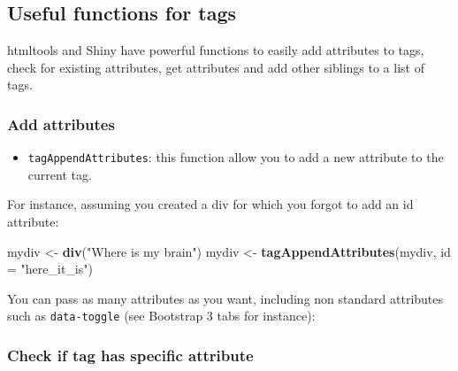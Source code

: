 \documentclass[
]{book}
\newenvironment{Shaded}{\begin{snugshade}}{\end{snugshade}}
\newcommand{\CommentTok}[1]{\textcolor[rgb]{0.56,0.35,0.01}{\textit{#1}}}
\newcommand{\DataTypeTok}[1]{\textcolor[rgb]{0.13,0.29,0.53}{#1}}
\newcommand{\KeywordTok}[1]{\textcolor[rgb]{0.13,0.29,0.53}{\textbf{#1}}}
\newcommand{\NormalTok}[1]{#1}
\newcommand{\OperatorTok}[1]{\textcolor[rgb]{0.81,0.36,0.00}{\textbf{#1}}}
\newcommand{\StringTok}[1]{\textcolor[rgb]{0.31,0.60,0.02}{#1}}
\providecommand{\tightlist}{%
  \setlength{\itemsep}{0pt}\setlength{\parskip}{0pt}}
\begin{document}
\hypertarget{useful-functions-for-tags}{%
\subsection{Useful functions for tags}\label{useful-functions-for-tags}}

htmltools and Shiny have powerful functions to easily add attributes to tags, check for existing attributes, get attributes and add other siblings to a list of tags.

\hypertarget{add-attributes}{%
\subsubsection{Add attributes}\label{add-attributes}}

\begin{itemize}
\tightlist
\item
  \texttt{tagAppendAttributes}: this function allow you to add a new attribute to the current tag.
\end{itemize}

For instance, assuming you created a div for which you forgot to add an id attribute:

\begin{Shaded}
\begin{Highlighting}[]
\NormalTok{mydiv <-}\StringTok{ }\KeywordTok{div}\NormalTok{(}\StringTok{"Where is my brain"}\NormalTok{)}
\NormalTok{mydiv <-}\StringTok{ }\KeywordTok{tagAppendAttributes}\NormalTok{(mydiv, }\DataTypeTok{id =} \StringTok{"here_it_is"}\NormalTok{)}
\end{Highlighting}
\end{Shaded}

You can pass as many attributes as you want, including non standard attributes such as \texttt{data-toggle} (see Bootstrap 3 tabs for instance):

\begin{Shaded}
\end{Shaded}

\hypertarget{check-if-tag-has-specific-attribute}{%
\subsubsection{Check if tag has specific attribute}\label{check-if-tag-has-specific-attribute}}
\end{document}
